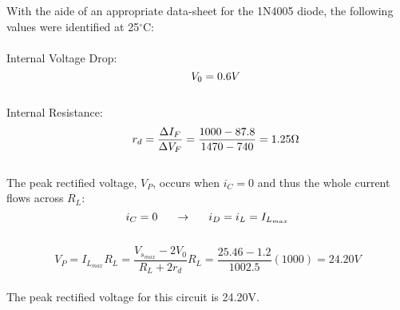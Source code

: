 \documentclass[]{article}
\begin{document}
{{		
\pagebreak
		
		
		\noindent With the aide of an appropriate data-sheet\cite{1N4005_Data} for the 1N4005 diode, the following values were identified at 25$^\circ$C:
		\\ \\
		\indent Internal Voltage Drop:
		\begin{equation}
			{ \indent V_0 = 0.6V }
		\end{equation}
		\\
		\indent Internal Resistance:
		\begin{equation}
			{ \indent r_d = \frac{\Delta I_F}{\Delta V_F} = \frac{1000 - 87.8}{1470 - 740} = 1.25\Omega }
		\end{equation}
		\\
		The peak rectified voltage, $V_P$, occurs when $i_C = 0$ and thus the whole current flows across $R_L$:
		\begin{equation} 
			i_C = 0 \indent \rightarrow \indent i_D = i_L = I_{L_{max}}
		\end{equation}
		\\
		\begin{equation} 
			V_P = I_{L_{max}} R_L = \frac{V_{s_{max}} - 2V_0}{R_L + 2r_d}R_L = \frac{25.46 - 1.2}{1002.5}(1000) = 24.20V
		\end{equation}
		\\
		The peak rectified voltage for this circuit is 24.20V.
	}
	\\
}
\end{document}
